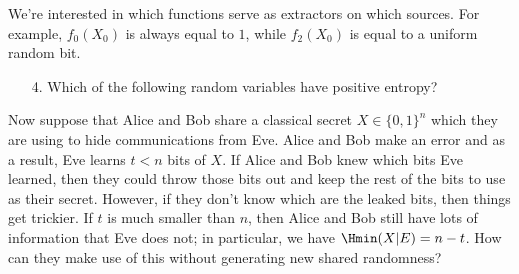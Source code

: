 \begin{exercises}
We're interested in which functions serve as extractors on which sources. For example, $f_0(X_0)$ is always equal to $1$, while $f_2(X_0)$ is equal to a uniform random bit.
\begin{enumerate}
\item[4.] Which of the following random variables have positive entropy?
\end{enumerate}
Now suppose that Alice and Bob share a classical secret $X\in \{0,1\}^n$ which they are using to hide communications from Eve. Alice and Bob make an error and as a result, Eve learns $t<n$ bits of $X$. If Alice and Bob knew which bits Eve learned, then they could throw those bits out and keep the rest of the bits to use as their secret.
However, if they don't know which are the leaked bits, then things get trickier. If $t$ is much smaller than $n$, then Alice and Bob still have lots of information that Eve does not; in particular, we have $\Hmin(X| E) = n-t$. How can they make use of this without generating new shared randomness?


\end{exercises}
